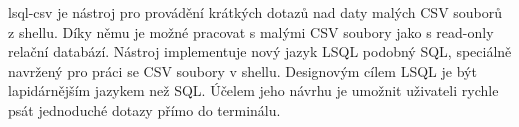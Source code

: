 \documentclass[a4paper]{article}
\begin{document}
lsql-csv je nástroj pro provádění krátkých dotazů nad daty malých CSV souborů z shellu. 
Díky němu je možné pracovat s malými CSV soubory jako s read-only relační databází.
Nástroj implementuje nový jazyk LSQL podobný SQL, speciálně navržený pro práci se CSV soubory v shellu.
Designovým cílem LSQL je být lapidárnějším jazykem než SQL.
Účelem jeho návrhu je umožnit uživateli rychle psát jednoduché dotazy přímo do terminálu.
\end{document}
